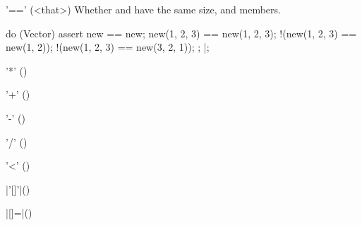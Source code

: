 \begin{urbiscriptapi}
\item['=='](<that>)%
  Whether \this and \that have the same size, and members.
\begin{urbiscript}
do (Vector)
{
  assert
  {
               new == new;
      new(1, 2, 3) == new(1, 2, 3);
    !(new(1, 2, 3) == new(1, 2));
    !(new(1, 2, 3) == new(3, 2, 1));
  };
}|;
\end{urbiscript}

\item['*']()%

\item['+']()%

\item['-']()%

\item['/']()%

\item['<']()%

\item|'[]'|()%

\item|[]=|()%

\end{urbiscriptapi}

